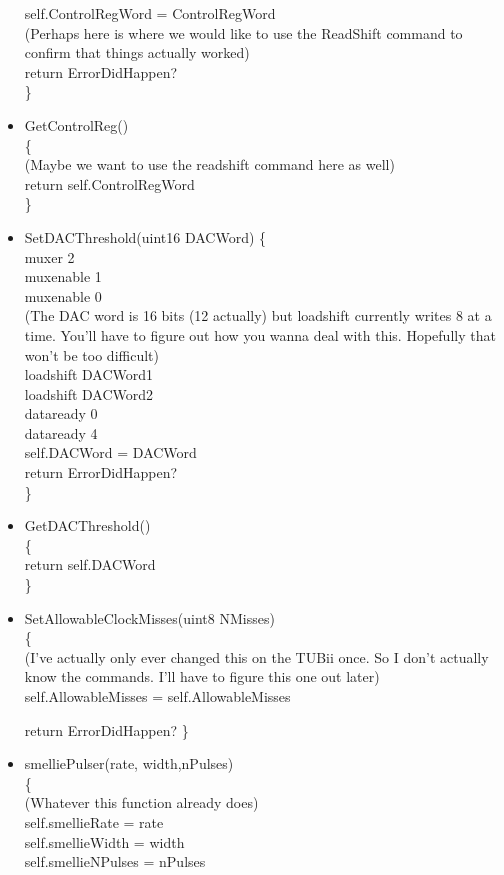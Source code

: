 \documentclass[12pt,a4paper]{article}
\begin{document}
\begin{itemize}
self.ControlRegWord = ControlRegWord\\
(Perhaps here is where we would like to use the ReadShift command to 
confirm that things actually worked)\\
return ErrorDidHappen?\\
\}\\
\item
GetControlReg()\\
\{\\
(Maybe we want to use the readshift command here as well)\\
return self.ControlRegWord\\
\}\\
\item
SetDACThreshold(uint16 DACWord)
\{\\
muxer 2\\
muxenable 1\\
muxenable 0\\
(The DAC word is 16 bits (12 actually) but loadshift currently writes 8 at a 
time. You'll have to figure out how you wanna deal with this.
Hopefully that won't be too difficult)\\

loadshift DACWord1\\
loadshift DACWord2\\
dataready 0\\
dataready 4\\

self.DACWord = DACWord\\

return ErrorDidHappen?\\
\}\\
\item
GetDACThreshold()\\
\{\\
return self.DACWord\\
\}\\
\item
SetAllowableClockMisses(uint8 NMisses)\\
\{\\
(I've actually only ever changed this on the TUBii once. 
So I don't actually know the commands. I'll have to figure this one out later)\\

self.AllowableMisses = self.AllowableMisses

return ErrorDidHappen?
\}\\
\item
smelliePulser(rate, width,nPulses)\\
\{\\
(Whatever this function already does)\\
self.smellieRate = rate\\
self.smellieWidth = width\\
self.smellieNPulses = nPulses\\


\end{itemize}
\end{document}
